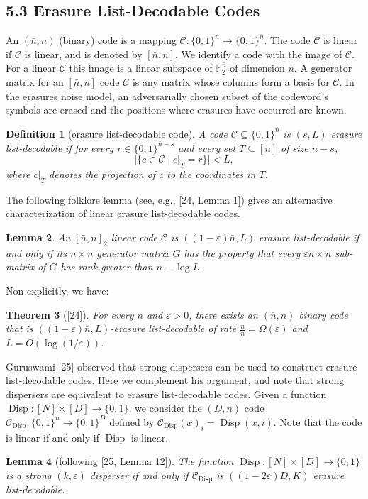 \documentclass[10pt,a4paper]{article}
\newtheorem{theorem}{Theorem}
\newtheorem{definition}[theorem]{Definition}
\newtheorem{lemma}[theorem]{Lemma}
\DeclareMathOperator{\Disp}{Disp}
\begin{document}
\subsection*{5.3 Erasure List-Decodable Codes}
An $(\bar n,n)$ (binary) code is a mapping $\mathcal C:\{0,1\}^n\to\{0,1\}^{\bar n}$. The code $\mathcal C$ is linear if $\mathcal C$ is linear, and is denoted by $[\bar n,n]$. We identify a code with the image of $\mathcal C$. For a linear $\mathcal C$ this image is a linear subspace of $\mathbb F_2^{\bar n}$ of dimension $n$. A generator matrix for an $[\bar n,n]$ code $\mathcal C$ is any matrix whose columns form a basis for $\mathcal C$. In the erasures noise model, an adversarially chosen subset of the codeword's symbols are erased and the positions where erasures have occurred are known.
\begin{definition}[erasure list-decodable code]
A code $\mathcal C\subseteq\{0,1\}^{\bar n}$ is $(s,L)$ erasure list-decodable if for every $r\in\{0,1\}^{\bar n-s}$ and every set $T\subseteq[\bar n]$ of size $\bar n-s$,
\[|\{c\in\mathcal C\mid c|_T=r\}|<L,\]
where $c|_T$ denotes the projection of $c$ to the coordinates in $T$.
\end{definition}
The following folklore lemma (see, e.g., [24, Lemma 1]) gives an alternative characterization of linear erasure list-decodable codes.
\begin{lemma}
An $[\bar n,n]_2$ linear code $\mathcal C$ is $((1-\varepsilon)\bar n,L)$ erasure list-decodable if and only if its $\bar n\times n$ generator matrix $G$ has the property that every $\varepsilon\bar n\times n$ sub-matrix of $G$ has rank greater than $n-\log L$.
\end{lemma}
Non-explicitly, we have:
\begin{theorem}[{[24]}]
For every $n$ and $\varepsilon>0$, there exists an $(\bar n,n)$ binary code that is $((1-\varepsilon)\bar n,L)$-erasure list-decodable of rate $\frac n{\bar n}=\Omega(\varepsilon)$ and $L=O(\log(1/\varepsilon))$.
\end{theorem}
Guruswami [25] observed that strong dispersers can be used to construct erasure list-decodable codes. Here we complement his argument, and note that strong dispersers are equivalent to erasure list-decodable codes. Given a function $\Disp:[N]\times[D]\to\{0,1\}$, we consider the $(D,n)$ code $\mathcal C_{\Disp}:\{0,1\}^n\to\{0,1\}^D$ defined by $\mathcal C_{\Disp}(x)_i=\Disp(x,i)$. Note that the code is linear if and only if $\Disp$ is linear.
\begin{lemma}[following {[25, Lemma 12]}]
The function $\Disp:[N]\times[D]\to\{0,1\}$ is a strong $(k,\varepsilon)$ disperser if and only if $\mathcal C_{\Disp}$ is $((1-2\varepsilon)D,K)$ erasure list-decodable.
\end{lemma}
\end{document}
